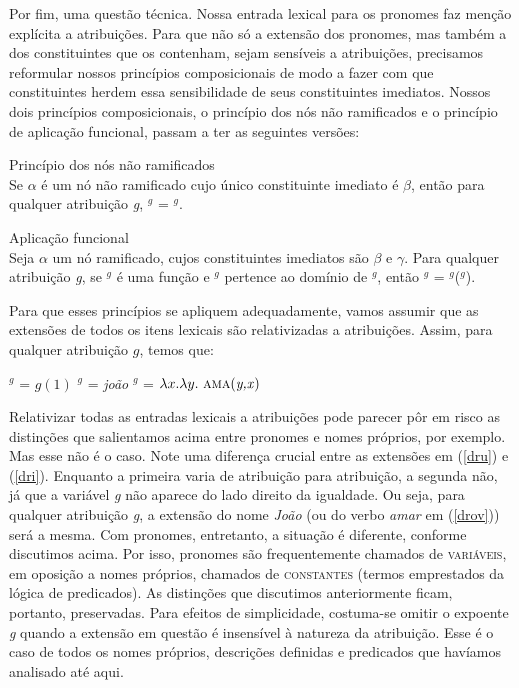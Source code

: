 Por fim, uma questão técnica. Nossa entrada lexical para os
pronomes faz menção explícita a atribuições. Para que não só a
extensão dos pronomes, mas também a dos constituintes que os
contenham, sejam sensíveis a atribuições, precisamos reformular
nossos princípios composicionais de modo a fazer com que
constituintes herdem essa sensibilidade de seus constituintes
imediatos. Nossos dois princípios composicionais, o princípio dos
nós não ramificados e o princípio de
aplicação funcional, passam a ter as seguintes versões:


\begin{exe}
	\ex Princípio dos nós não ramificados \\
	Se $\alpha$ é um nó não ramificado cujo único constituinte imediato é $\beta$, então para qualquer atribuição \textit{g}, \den{$\alpha$}$^{g}$ = \den{$\beta$}$^{g}$.
\end{exe}

\begin{exe}
	\ex Aplicação funcional\\
	Seja $\alpha$ um nó ramificado, cujos constituintes imediatos são $\beta$ e $\gamma$. Para qualquer atribuição \textit{g}, se \den{$\beta$}$^{g}$ é uma função e \den{$\gamma$}$^{g}$ pertence ao domínio de \den{$\beta$}$^{g}$, então \den{$\alpha$}$^{g}$ = \den{$\beta$}$^{g}$(\den{$\gamma$}$^{g}$).
\end{exe}

Para que esses princípios se apliquem adequadamente, vamos assumir
que as extensões de todos os itens lexicais são relativizadas a atribuições. Assim, para qualquer atribuição $g$, temos que:

\begin{exe}
\ex\label{dr}
\begin{xlist}
\ex {}$^{g}$ = $g(1)$\label{dru}
\ex {}$^{g}$ = \textit{joão}\label{dri}
\ex {}$^{g}$ = $\lambda x.\lambda y.\ \predica{ama}{y,x}$\label{drov}
\end{xlist}
\end{exe}

Relativizar todas as entradas lexicais a atribuições pode
parecer pôr em risco as distinções que salientamos acima entre
pronomes e nomes próprios, por exemplo. Mas esse não é o caso.
Note uma diferença crucial entre as extensões em (\ref{dru}) e
(\ref{dri}). Enquanto a primeira varia de atribuição para
atribuição, a segunda não, já que a variável \textit{g}
não aparece do lado direito da igualdade. Ou seja, para qualquer
atribuição \textit{g}, a extensão do nome \textit{João} (ou do
verbo \textit{amar} em (\ref{drov})) será a mesma. Com pronomes, entretanto, a
situação é diferente, conforme discutimos acima. Por isso, pronomes são frequentemente chamados de \textsc{variáveis}, em oposição a nomes próprios, chamados de \textsc{constantes} (termos emprestados da lógica de predicados). As distinções que
discutimos anteriormente ficam, portanto, preservadas. Para efeitos de
simplicidade, costuma-se omitir o expoente \textit{g} quando a
extensão em questão é insensível à natureza da atribuição. Esse
é o caso de todos os nomes próprios, descrições definidas e
predicados que havíamos analisado até aqui.

